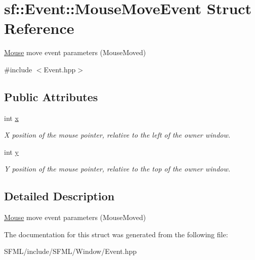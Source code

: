 \hypertarget{structsf_1_1_event_1_1_mouse_move_event}{}\section{sf\+:\+:Event\+:\+:Mouse\+Move\+Event Struct Reference}
\label{structsf_1_1_event_1_1_mouse_move_event}


\mbox{\hyperlink{classsf_1_1_mouse}{Mouse}} move event parameters (Mouse\+Moved)  




{\ttfamily \#include $<$Event.\+hpp$>$}

\subsection*{Public Attributes}
\begin{DoxyCompactItemize}
\item 
\mbox{\label{structsf_1_1_event_1_1_mouse_move_event_aa3a23809afb905cbb52c66d8512e21fd}} 
int \mbox{\hyperlink{structsf_1_1_event_1_1_mouse_move_event_aa3a23809afb905cbb52c66d8512e21fd}{x}}
\begin{DoxyCompactList}\small\item\em X position of the mouse pointer, relative to the left of the owner window. \end{DoxyCompactList}\item 
\mbox{\label{structsf_1_1_event_1_1_mouse_move_event_a86d78a2fba5b3abda16ca059f2392ad4}} 
int \mbox{\hyperlink{structsf_1_1_event_1_1_mouse_move_event_a86d78a2fba5b3abda16ca059f2392ad4}{y}}
\begin{DoxyCompactList}\small\item\em Y position of the mouse pointer, relative to the top of the owner window. \end{DoxyCompactList}\end{DoxyCompactItemize}


\subsection{Detailed Description}
\mbox{\hyperlink{classsf_1_1_mouse}{Mouse}} move event parameters (Mouse\+Moved) 

\begin{DoxyVerb}\end{DoxyVerb}
 

The documentation for this struct was generated from the following file\+:\begin{DoxyCompactItemize}
\item 
S\+F\+M\+L/include/\+S\+F\+M\+L/\+Window/Event.\+hpp\end{DoxyCompactItemize}
